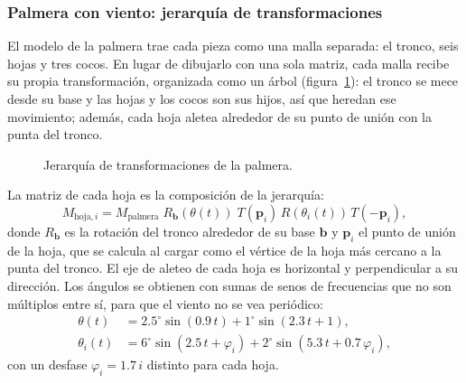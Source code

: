 \documentclass[12pt,letterpaper]{article}
\begin{document}
\subsubsection{Palmera con viento: jerarquía de transformaciones}
\label{sec:palmera}
El modelo de la palmera trae cada pieza como una malla separada: el tronco, seis hojas y
tres cocos. En lugar de dibujarlo con una sola matriz, cada malla recibe su propia
transformación, organizada como un árbol (figura~\ref{fig:jerarquia}): el tronco se mece
desde su base y las hojas y los cocos son sus hijos, así que heredan ese movimiento; además,
cada hoja aletea alrededor de su punto de unión con la punta del tronco.

\begin{figure}[H]
  \centering
  \caption{Jerarquía de transformaciones de la palmera.}
  \label{fig:jerarquia}
\end{figure}

La matriz de cada hoja es la composición de la jerarquía:
\begin{equation}
  M_{\text{hoja},i} = M_{\text{palmera}}\; R_{\mathbf{b}}\!\left(\theta(t)\right)\;
  T(\mathbf{p}_i)\, R\!\left(\theta_i(t)\right)\, T(-\mathbf{p}_i),
\end{equation}
donde $R_{\mathbf{b}}$ es la rotación del tronco alrededor de su base $\mathbf{b}$ y
$\mathbf{p}_i$ el punto de unión de la hoja, que se calcula al cargar como el vértice de la
hoja más cercano a la punta del tronco. El eje de aleteo de cada hoja es horizontal y
perpendicular a su dirección. Los ángulos se obtienen con sumas de senos de frecuencias que
no son múltiplos entre sí, para que el viento no se vea periódico:
\begin{align}
  \theta(t)   &= 2.5^\circ \sin(0.9\,t) + 1^\circ \sin(2.3\,t + 1), \\
  \theta_i(t) &= 6^\circ \sin(2.5\,t + \varphi_i) + 2^\circ \sin(5.3\,t + 0.7\,\varphi_i),
\end{align}
con un desfase $\varphi_i = 1.7\,i$ distinto para cada hoja.
\end{document}
